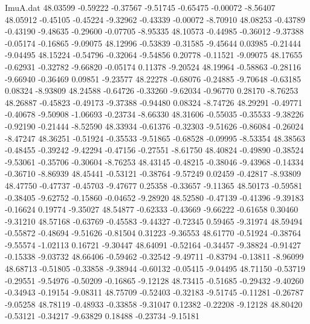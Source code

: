 \begin{filecontents}{ImuA.dat}
  48.03599   -0.59222   -0.37567   -9.51745   -0.65475   -0.00072   -8.56407
  48.05912   -0.45105   -0.45224   -9.32962   -0.43339   -0.00072   -8.70910
  48.08253   -0.43789   -0.43190   -9.48635   -0.29600   -0.07705   -8.95335
  48.10573   -0.44985   -0.36012   -9.37388   -0.05174   -0.16865   -9.09075
  48.12996   -0.53839   -0.31585   -9.45644    0.03985   -0.21444   -9.04495
  48.15224   -0.54796   -0.32064   -9.54856    0.20778   -0.11521   -9.09075
  48.17655   -0.62931   -0.32782   -9.66820   -0.05174    0.11378   -9.20524
  48.19964   -0.58863   -0.28116   -9.66940   -0.36469    0.09851   -9.23577
  48.22278   -0.68076   -0.24885   -9.70648   -0.63185    0.08324   -8.93809
  48.24588   -0.64726   -0.33260   -9.62034   -0.96770    0.28170   -8.76253
  48.26887   -0.45823   -0.49173   -9.37388   -0.94480    0.08324   -8.74726
  48.29291   -0.49771   -0.40678   -9.50908   -1.06693   -0.23734   -8.66330
  48.31606   -0.55035   -0.35533   -9.38226   -0.92190   -0.21444   -8.52590
  48.33934   -0.61376   -0.32303   -9.51626   -0.86084   -0.26024   -8.47247
  48.36251   -0.51924   -0.35533   -9.51865   -0.68528   -0.09995   -8.53354
  48.38563   -0.48455   -0.39242   -9.42294   -0.47156   -0.27551   -8.61750
  48.40824   -0.49890   -0.38524   -9.53061   -0.35706   -0.30604   -8.76253
  48.43145   -0.48215   -0.38046   -9.43968   -0.14334   -0.36710   -8.86939
  48.45441   -0.53121   -0.38764   -9.57249    0.02459   -0.42817   -8.93809
  48.47750   -0.47737   -0.45703   -9.47677    0.25358   -0.33657   -9.11365
  48.50173   -0.59581   -0.38405   -9.62752   -0.15860   -0.04652   -9.28920
  48.52580   -0.47139   -0.41396   -9.39183   -0.16624    0.19774   -9.35027
  48.54877   -0.62333   -0.43669   -9.66222   -0.61658    0.30460   -9.31210
  48.57168   -0.63769   -0.45583   -9.44327   -0.72345    0.59465   -9.31974
  48.59494   -0.55872   -0.48694   -9.51626   -0.81504    0.31223   -9.36553
  48.61770   -0.51924   -0.38764   -9.55574   -1.02113    0.16721   -9.30447
  48.64091   -0.52164   -0.34457   -9.38824   -0.91427   -0.15338   -9.03732
  48.66406   -0.59462   -0.32542   -9.49711   -0.83794   -0.13811   -8.96099
  48.68713   -0.51805   -0.33858   -9.38944   -0.60132   -0.05415   -9.04495
  48.71150   -0.53719   -0.29551   -9.54976   -0.50209   -0.16865   -9.12128
  48.73415   -0.51685   -0.29432   -9.40260   -0.34943   -0.19154   -9.08311
  48.75709   -0.52403   -0.32183   -9.51745   -0.11281   -0.26787   -9.05258
  48.78119   -0.48933   -0.33858   -9.31047    0.12382   -0.22208   -9.12128
  48.80420   -0.53121   -0.34217   -9.63829    0.18488   -0.23734   -9.15181

\end{filecontents}

